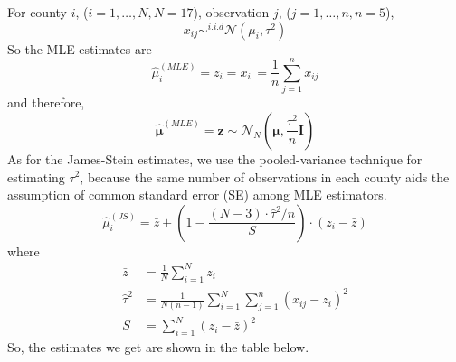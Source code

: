 \documentclass{article}
\begin{document}
For county $i$, ($i=1,\dots,N, N=17$), observation $j$, ($j=1,\dots,n, n=5$),
\begin{displaymath}
x_{ij} \sim^{i.i.d} \mathcal{N}(\mu_i,\tau^2)
\end{displaymath}
So the MLE estimates are
\begin{displaymath}
\hat{\mu}_i^{(MLE)}= z_i = x_{i.} = \frac{1}{n} \sum_{j=1}^n x_{ij}
\end{displaymath}
and therefore,
\begin{displaymath}
\hat{\bm{\mu}}^{(MLE)}=\bm{z} \sim \mathcal{N}_N(\bm{\mu},\frac{\tau^2}{n}\bm{I})
\end{displaymath}
As for the James-Stein estimates, we use the pooled-variance technique for estimating
$\tau^2$, because the same number of observations in each county aids the 
assumption of common standard error (SE) among MLE estimators.
\begin{displaymath}
\hat{\mu}_i^{(JS)} = \bar{z} + (1-\frac{(N-3)\cdot \hat{\tau}^2/n}{S})\cdot(z_i - \bar{z})
\end{displaymath}
where
\begin{displaymath}
\begin{split}
\bar{z} &= \frac{1}{N} \sum_{i=1}^N z_i \\
\hat{\tau}^2 &= \frac{1}{N(n-1)} \sum_{i=1}^N \sum_{j=1}^n (x_{ij} - z_i)^2\\
S &= \sum_{i=1}^N (z_i - \bar{z})^2
\end{split}
\end{displaymath}
So, the estimates we get are shown in the table below.
\end{document}
